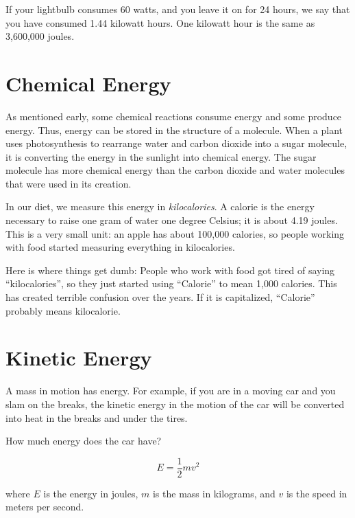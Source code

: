 If your lightbulb consumes 60 watts, and you leave it on for 24 hours,
we say that you have consumed 1.44 kilowatt hours. One kilowatt hour
is the same as 3,600,000 joules.

\section{Chemical Energy}

As mentioned early, some chemical reactions consume energy and some
produce energy. Thus, energy can be stored in the structure of a
molecule. When a plant uses photosynthesis to rearrange water and
carbon dioxide into a sugar molecule, it is converting the energy in
the sunlight into chemical energy. The sugar molecule has more
chemical energy than the carbon dioxide and water molecules that were
used in its creation.

In our diet, we measure this energy in \textit{kilocalories}. A
calorie is the energy necessary to raise one gram of water one degree
Celsius; it is about 4.19 joules. This is a very small unit: an apple
has about 100,000 calories, so people working with food started
measuring everything in kilocalories.

Here is where things get dumb: People who work with food got tired of
saying ``kilocalories'', so they just started using ``Calorie'' to
mean 1,000 calories.  This has created terrible confusion over the
years. If it is capitalized, ``Calorie'' probably means kilocalorie.

\section{Kinetic Energy}

A mass in motion has energy. For example, if you are in a moving car
and you slam on the breaks, the kinetic energy in the motion of the
car will be converted into heat in the breaks and under the tires.

How much energy does the car have?

\begin{mdframed}[style=important, frametitle={Formula for Kinetic Energy}]

$$E = \frac{1}{2} m v^2$$

where $E$ is the energy in joules, $m$ is the mass in kilograms, and
$v$ is the speed in meters per second.

\end{mdframed}


